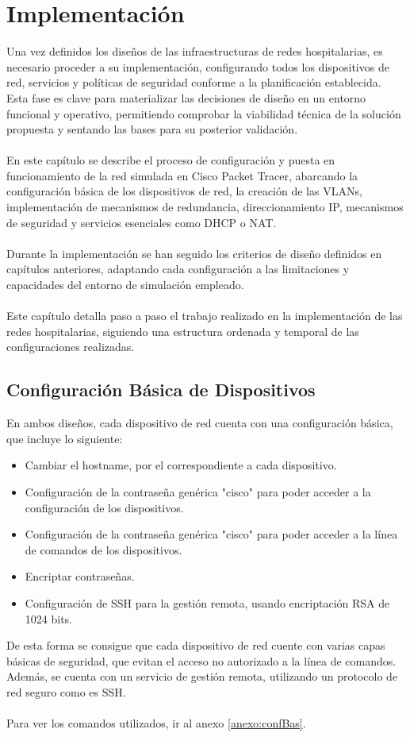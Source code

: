 
\chapter{Implementación}\label{Implementación}
Una vez definidos los diseños de las infraestructuras de redes hospitalarias, es necesario proceder a su implementación, configurando todos los dispositivos de red, servicios y políticas de seguridad conforme a la planificación establecida. Esta fase es clave para materializar las decisiones de diseño en un entorno funcional y operativo, permitiendo comprobar la viabilidad técnica de la solución propuesta y sentando las bases para su posterior validación.
\\ \\
En este capítulo se describe el proceso de configuración y puesta en funcionamiento de la red simulada en Cisco Packet Tracer, abarcando la configuración básica de los dispositivos de red, la creación de las VLANs, implementación de mecanismos de redundancia, direccionamiento IP, mecanismos de seguridad y servicios esenciales como DHCP o NAT.
\\ \\
Durante la implementación se han seguido los criterios de diseño definidos en capítulos anteriores, adaptando cada configuración a las limitaciones y capacidades del entorno de simulación empleado.
\\ \\
Este capítulo detalla paso a paso el trabajo realizado en la implementación de las redes hospitalarias, siguiendo una estructura ordenada y temporal de las configuraciones realizadas.

\section{Configuración Básica de Dispositivos}
En ambos diseños, cada dispositivo de red cuenta con una configuración básica, que incluye lo siguiente:
\begin{itemize}
    \item Cambiar el hostname, por el correspondiente a cada dispositivo.
    \item Configuración de la contraseña genérica "cisco" para poder acceder a la configuración de los dispositivos.
    \item Configuración de la contraseña genérica "cisco" para poder acceder a la línea de comandos de los dispositivos.
    \item Encriptar contraseñas.
    \item Configuración de SSH para la gestión remota, usando encriptación RSA de 1024 bits.
\end{itemize}
De esta forma se consigue que cada dispositivo de red cuente con varias capas básicas de seguridad, que evitan el acceso no autorizado a la línea de comandos. Además, se cuenta con un servicio de gestión remota, utilizando un protocolo de red seguro como es SSH.
\\ \\
Para ver los comandos utilizados, ir al anexo \ref{anexo:confBas}.

